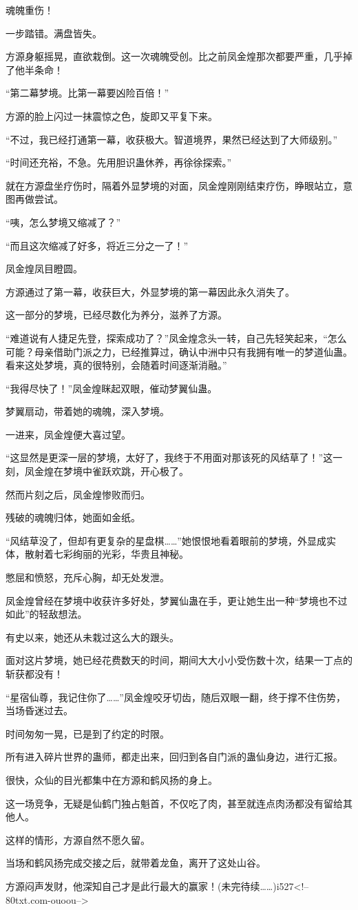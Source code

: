 \begin{this_body}
魂魄重伤！

一步踏错。满盘皆失。

方源身躯摇晃，直欲栽倒。这一次魂魄受创。比之前凤金煌那次都要严重，几乎掉了他半条命！

“第二幕梦境。比第一幕要凶险百倍！”

方源的脸上闪过一抹震惊之色，旋即又平复下来。

“不过，我已经打通第一幕，收获极大。智道境界，果然已经达到了大师级别。”

“时间还充裕，不急。先用胆识蛊休养，再徐徐探索。”

就在方源盘坐疗伤时，隔着外显梦境的对面，凤金煌刚刚结束疗伤，睁眼站立，意图再做尝试。

“咦，怎么梦境又缩减了？”

“而且这次缩减了好多，将近三分之一了！”

凤金煌凤目瞪圆。

方源通过了第一幕，收获巨大，外显梦境的第一幕因此永久消失了。

这一部分的梦境，已经尽数化为养分，滋养了方源。

“难道说有人捷足先登，探索成功了？”凤金煌念头一转，自己先轻笑起来，“怎么可能？母亲借助门派之力，已经推算过，确认中洲中只有我拥有唯一的梦道仙蛊。看来这处梦境，真的很特别，会随着时间逐渐消融。”

“我得尽快了！”凤金煌眯起双眼，催动梦翼仙蛊。

梦翼扇动，带着她的魂魄，深入梦境。

一进来，凤金煌便大喜过望。

“这显然是更深一层的梦境，太好了，我终于不用面对那该死的风结草了！”这一刻，凤金煌在梦境中雀跃欢跳，开心极了。

然而片刻之后，凤金煌惨败而归。

残破的魂魄归体，她面如金纸。

“风结草没了，但却有更复杂的星盘棋……”她恨恨地看着眼前的梦境，外显成实体，散射着七彩绚丽的光彩，华贵且神秘。

憋屈和愤怒，充斥心胸，却无处发泄。

凤金煌曾经在梦境中收获许多好处，梦翼仙蛊在手，更让她生出一种“梦境也不过如此”的轻敌想法。

有史以来，她还从未栽过这么大的跟头。

面对这片梦境，她已经花费数天的时间，期间大大小小受伤数十次，结果一丁点的斩获都没有！

“星宿仙尊，我记住你了……”凤金煌咬牙切齿，随后双眼一翻，终于撑不住伤势，当场昏迷过去。

时间匆匆一晃，已是到了约定的时限。

所有进入碎片世界的蛊师，都走出来，回归到各自门派的蛊仙身边，进行汇报。

很快，众仙的目光都集中在方源和鹤风扬的身上。

这一场竞争，无疑是仙鹤门独占魁首，不仅吃了肉，甚至就连点肉汤都没有留给其他人。

这样的情形，方源自然不愿久留。

当场和鹤风扬完成交接之后，就带着龙鱼，离开了这处山谷。

方源闷声发财，他深知自己才是此行最大的赢家！(未完待续……)i527<!--80txt.com-ouoou-->

\end{this_body}

